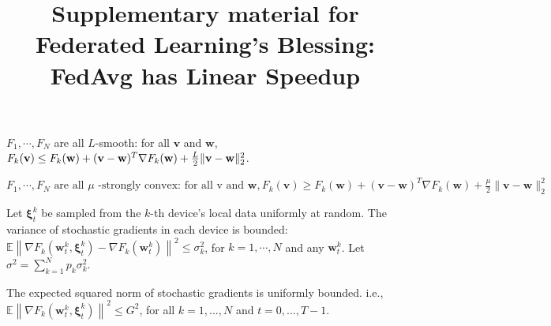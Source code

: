 \documentclass{article}
\title{Supplementary material for \\ Federated Learning's Blessing: \\FedAvg has Linear Speedup}
\begin{document}
\maketitle
\tableofcontents


% 


\appendix



\begin{assumption}[L-smooth]
	$F_{1}, \cdots, F_{N}$ are all $L$-smooth: for all  $\mathbf{v}$  and $\mathbf{w}$, $F_{k}(\mathbf{v}) \leq F_{k}(\mathbf{w})+(\mathbf{v}- \\ \mathbf{w})^{T} \nabla F_{k}(\mathbf{w})+\frac{L}{2}\|\mathbf{v}-\mathbf{w}\|_{2}^{2}$.
	\label{ass:lsmooth}
\end{assumption}
\begin{assumption}
	$	F_{1}, \cdots, F_{N} \text { are all } \mu \text { -strongly convex: for all v and } \mathbf{w}, F_{k}(\mathbf{v}) \geq F_{k}(\mathbf{w})+(\mathbf{v}-\mathbf{w})^{T} \nabla F_{k}(\mathbf{w})+\frac{\mu}{2}\|\mathbf{v}-\mathbf{w}\|_{2}^{2}$
	\label{ass:stroncvx}
\end{assumption}
\begin{assumption}
	Let $\mathbf{\xi}_{t}^{k}$ be sampled from the $k$-th device's local data uniformly at random. The variance of stochastic gradients in each device is bounded: $\mathbb{E}\left\|\nabla F_{k}\left(\mathbf{w}_{t}^{k}, \mathbf{\xi}_{t}^{k}\right)-\nabla F_{k}\left(\mathbf{w}_{t}^{k}\right)\right\|^{2} \leq \sigma_{k}^{2}$,
	for $k=1, \cdots, N$ and any $\mathbf{w}_{t}^{k}$. Let $\sigma^2=\sum_{k=1}^{N}p_k\sigma_{k}^{2}$.
	\label{ass:boundedvariance}
\end{assumption}
\begin{assumption}
	The expected squared norm of stochastic gradients is uniformly bounded. i.e.,
	$\mathbb{E}\left\|\nabla F_{k}\left(\mathbf{w}_{t}^{k}, \mathbf{\xi}_{t}^{k}\right)\right\|^{2} \leq G^{2}$, for all $k = 1,..., N$ and $t=0, \dots, T-1$.
	\label{ass:subgrad2}
\end{assumption}




\end{document}

